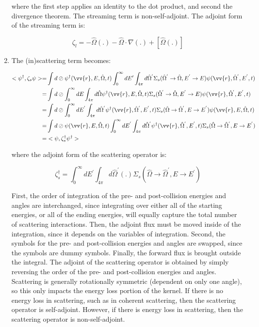 \documentclass[10pt]{article}
\newcommand{\hO}{\hat{\Omega}}
\newcommand{\spa}{(\vv{r}, E, \hO, t)}
\begin{document}
\begin{flushleft}
\begin{enumerate}
where the first step applies an identity to the dot product, and second the divergence theorem. The streaming term is non-self-adjoint. The adjoint form of the streaming term is:

\begin{equation}
\zeta_l=-\hO  (.)-\hO  \cdot\nabla(.)+\left\lbrack\hO  (.)\right\rbrack
\end{equation}

\item The (in)scattering term becomes:

\begin{equation}
\begin{aligned}
<\psi^\dagger,\zeta_s\psi>=& \int d\oslash\psi^\dagger\spa \int_0^\infty dE'\int_{4\pi}d\hO  ^{'}\Sigma_s(\hO  ^{'}\rightarrow\hO  , E^{'}\rightarrow E)\psi(\vv{r},\hO  ^{'},E^{'},t)\\
=& \int d\oslash\int_0^\infty dE\int_{4\pi}d\hO  \psi^\dagger\spa \Sigma_s(\hO  ^{'}\rightarrow\hO  , E^{'}\rightarrow E)\psi(\vv{r},\hO  ^{'},E^{'},t)\\
=& \int d\oslash\int_0^\infty dE^{'}\int_{4\pi}d\hO  ^{'}\psi^\dagger(\vv{r},\hO  ^{'},E^{'},t)\Sigma_s(\hO  \rightarrow\hO  ^{'}, E\rightarrow E^{'})\psi\spa \\
=& \int d\oslash\psi\spa \int_0^\infty dE^{'}\int_{4\pi}d\hO  ^{'}\psi^\dagger(\vv{r},\hO  ^{'},E^{'},t)\Sigma_s(\hO  \rightarrow\hO  ^{'}, E\rightarrow E^{'})\\
=& <\psi, \zeta_s^\dagger\psi^\dagger>
\end{aligned}
\end{equation}

where the adjoint form of the scattering operator is:

\begin{equation}
\zeta_s^\dagger= \int_0^\infty dE^{'}\int_{4\pi}d\hO  ^{'}(.)\Sigma_s(\hO  \rightarrow\hO  ^{'}, E\rightarrow E^{'})
\end{equation}

First, the order of integration of the pre- and post-collision energies and angles are interchanged, since integrating over either all of the starting energies, or all of the ending energies, will equally capture the total number of scattering interactions. Then, the adjoint flux must be moved inside of the integration, since it depends on the variables of integration. Second, the symbols for the pre- and post-collision energies and angles are swapped, since the symbols are dummy symbols. Finally, the forward flux is brought outside the integral. The adjoint of the scattering operator is obtained by simply reversing the order of the pre- and post-collision energies and angles. Scattering is generally rotationally symmetric (dependent on only one angle), so this only impacts the energy loss portion of the kernel. If there is no energy loss in scattering, such as in coherent scattering, then the scattering operator is self-adjoint. However, if there is energy loss in scattering, then the scattering operator is non-self-adjoint.


\end{enumerate}
\end{flushleft}
\end{document}
